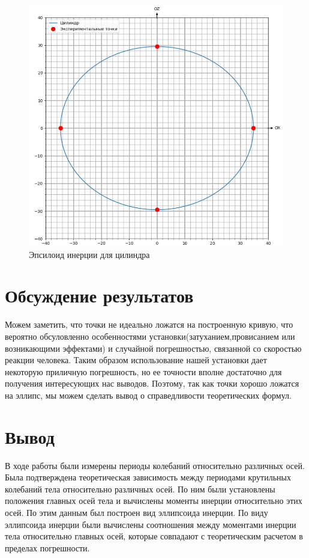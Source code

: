 \documentclass[a4paper, 10pt]{article}%
\begin{document}
\begin{figure}[h]
                \centering
                \includegraphics[width=0.7\linewidth]{tsilindr.png}
                \caption{Эпсилоид инерции для цилиндра}
                \label{fig:mpr}
\end{figure}
\section{Обсуждение результатов}
Можем заметить, что точки не идеально ложатся на построенную кривую, что вероятно обсуловленно
особенностями установки(затуханием,провисанием или возникающими эффектами) и случайной погрешностью, связанной
со скоростью реакции человека. Таким образом использование нашей установки дает некоторую приличную погрешность, 
но ее точности вполне достаточно для получения интересующих нас выводов. Поэтому, так как точки хорошо ложатся на эллипс,
мы можем сделать вывод о справедливости теоретических формул.
\section{Вывод}В ходе работы были измерены периоды колебаний относительно различных осей.
Была подтверждена теоретическая зависимость между периодами крутильных колебаний тела относительно 
различных осей. По ним были установлены положения главных осей тела и вычислены моменты инерции относительно этих осей.
По этим данным был построен вид эллипсоида инерции.
По виду эллипсоида инерции были вычислены соотношения между моментами инерции тела относительно главных осей,
которые совпадают с теоретическим расчетом в пределах погрешности.
\end{document}
